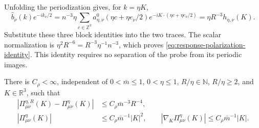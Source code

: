 \documentclass[11pt,letterpaper,reqno]{amsart}
\newcommand{\R}{\mathbb R}
\newcommand{\Z}{\mathbb Z}
\newcommand{\N}{\mathbb N}
\begin{document}
Unfolding the periodization gives, for $k=\eta K$,
\[
 \widehat b_\nu(k)e^{-ik_\nu/2}
     =n^{-3}\eta\sum_{c\in\Z^3}
          a_{\eta,\nu}^0(\eta c+\eta e_\nu/2)
                            e^{-iK\cdot(\eta c+\eta e_\nu/2)}
     =\eta R^{-3}h_{\eta,\nu}(K).
\]
Substitute these three block identities into the two traces.
The scalar normalization is
$\eta^2R^{-6}=R^{-3}\eta^{-1}n^{-3}$, which proves
\eqref{eq:response-polarization-identity}. This identity
requires no separation of the probe from its periodic images.

\begin{proposition}\label{prop:response-polarization-bounds}
There is $C_\rho<\infty$, independent of $0<\bar m\le1$,
$0<\eta\le1$, $R/\eta\in\N$, $R/\eta\ge2$, and $K\in\R^3$,
such that
\begin{align}
 |\Pi^{\eta,R}_{\mu\nu}(K)-\Pi^\eta_{\mu\nu}(K)|
       &\le C_\rho\bar m^{-3}R^{-4},
                            \label{eq:response-polarization-quadrature}\\
 |\Pi^\eta_{\mu\nu}(K)|&\le C_\rho\bar m^{-1}|K|^2,\qquad
 |\nabla_K\Pi^\eta_{\mu\nu}(K)|
                    \le C_\rho\bar m^{-1}|K|.
                            \label{eq:response-polarization-quadratic}
\end{align}
\end{proposition}
\end{document}
